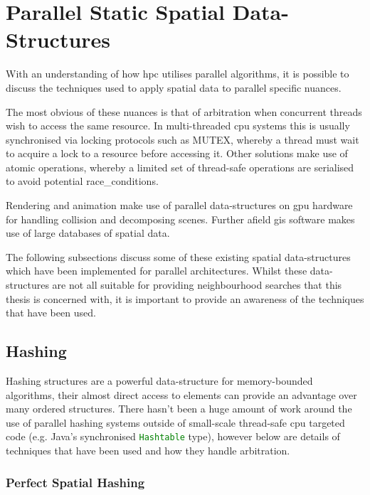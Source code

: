 \section{Parallel Static Spatial Data-Structures\label{sec:parallel-static-spatial}}
  With an understanding of how \gls{hpc} utilises parallel algorithms, it is possible to discuss the techniques used to apply spatial data to parallel specific nuances.
  
  The most obvious of these nuances is that of arbitration when concurrent threads wish to access the same resource. In multi-threaded \gls{cpu} systems this is usually synchronised via locking protocols such as MUTEX, whereby a thread must wait to acquire a lock to a resource before accessing it. Other solutions make use of \gls{atomic} operations, whereby a limited set of thread-safe operations are  serialised to avoid potential \glspl{race_condition}.
  
  Rendering and animation make use of parallel data-structures on \gls{gpu} hardware for handling collision and decomposing scenes. Further afield \gls{gis} software makes use of large databases of spatial data.
  
  The following subsections discuss some of these existing spatial data-structures which have been implemented for parallel architectures. Whilst these data-structures are not all suitable for providing neighbourhood searches that this thesis is concerned with, it is important to provide an awareness of the techniques that have been used.
  
  \subsection{Hashing\label{subsec:parallel-hash}}
    Hashing structures are a powerful data-structure for memory-bounded algorithms, their almost direct access to elements can provide an advantage over many ordered structures. There hasn't been a huge amount of work around the use of parallel hashing systems outside of small-scale thread-safe \gls{cpu} targeted code (e.g. Java's synchronised \lstinline[language={Java}]!Hashtable! type), however below are details of techniques that have been used and how they handle arbitration.
    
    \subsubsection*{Perfect Spatial Hashing}

